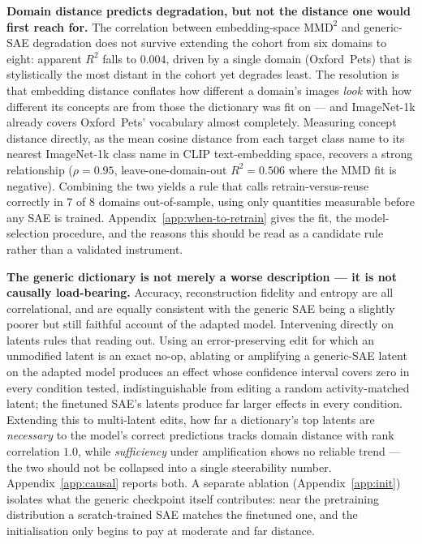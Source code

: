 {\bf Domain distance predicts degradation, but not the distance one would first reach for.}
The correlation between embedding-space $\mathrm{MMD}^2$ and generic-SAE degradation does not survive extending the cohort from six domains to eight: apparent $R^2$ falls to $0.004$, driven by a single domain (Oxford~Pets) that is stylistically the most distant in the cohort yet degrades least.
The resolution is that embedding distance conflates how different a domain's images \emph{look} with how different its concepts are from those the dictionary was fit on --- and ImageNet-1k already covers Oxford~Pets' vocabulary almost completely.
Measuring concept distance directly, as the mean cosine distance from each target class name to its nearest ImageNet-1k class name in CLIP text-embedding space, recovers a strong relationship ($\rho = 0.95$, leave-one-domain-out $R^2 = 0.506$ where the MMD fit is negative).
Combining the two yields a rule that calls retrain-versus-reuse correctly in $7$ of $8$ domains out-of-sample, using only quantities measurable before any SAE is trained.
Appendix~\ref{app:when-to-retrain} gives the fit, the model-selection procedure, and the reasons this should be read as a candidate rule rather than a validated instrument.

{\bf The generic dictionary is not merely a worse description --- it is not causally load-bearing.}
Accuracy, reconstruction fidelity and entropy are all correlational, and are equally consistent with the generic SAE being a slightly poorer but still faithful account of the adapted model.
Intervening directly on latents rules that reading out.
Using an error-preserving edit for which an unmodified latent is an exact no-op, ablating or amplifying a generic-SAE latent on the adapted model produces an effect whose confidence interval covers zero in every condition tested, indistinguishable from editing a random activity-matched latent; the finetuned SAE's latents produce far larger effects in every condition.
Extending this to multi-latent edits, how far a dictionary's top latents are \emph{necessary} to the model's correct predictions tracks domain distance with rank correlation $1.0$, while \emph{sufficiency} under amplification shows no reliable trend --- the two should not be collapsed into a single steerability number.
Appendix~\ref{app:causal} reports both.
A separate ablation (Appendix~\ref{app:init}) isolates what the generic checkpoint itself contributes: near the pretraining distribution a scratch-trained SAE matches the finetuned one, and the initialisation only begins to pay at moderate and far distance.

